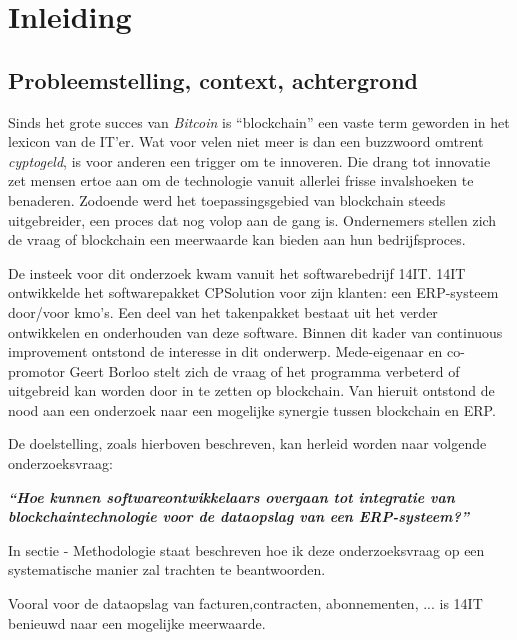 
\chapter{Inleiding}
\label{ch:inleiding}

\section{Probleemstelling, context, achtergrond}
\label{sec:probleemstelling}

Sinds het grote succes van \textit{Bitcoin} is ``blockchain'' een vaste term geworden in het lexicon van de IT'er. Wat voor velen niet meer is dan een buzzwoord omtrent \textit{cyptogeld}, is voor anderen een trigger om te innoveren.
Die drang tot innovatie zet mensen ertoe aan om de technologie vanuit allerlei frisse invalshoeken te benaderen. Zodoende werd het toepassingsgebied van blockchain steeds uitgebreider, een proces dat nog volop aan de gang is. Ondernemers stellen zich de vraag of blockchain een meerwaarde kan bieden aan hun bedrijfsproces.

De insteek voor dit onderzoek kwam vanuit het softwarebedrijf 14IT. 14IT ontwikkelde het softwarepakket CPSolution voor zijn klanten: een ERP-systeem door/voor kmo's. Een deel van het takenpakket bestaat uit het verder ontwikkelen en onderhouden van deze software. Binnen dit kader van continuous improvement ontstond de interesse in dit onderwerp. Mede-eigenaar en co-promotor Geert Borloo stelt zich de vraag of het programma verbeterd of uitgebreid kan worden door in te zetten op blockchain. Van hieruit ontstond de nood aan een onderzoek naar een mogelijke synergie tussen blockchain en ERP. 

De doelstelling, zoals hierboven beschreven, kan herleid worden naar volgende onderzoeksvraag:

\begin{center}
	\textit{\textbf{``Hoe kunnen softwareontwikkelaars overgaan tot integratie van blockchaintechnologie voor de dataopslag van een ERP-systeem?''}}
\end{center}

In sectie - Methodologie staat beschreven hoe ik deze onderzoeksvraag op een systematische manier zal trachten te beantwoorden.

Vooral voor de dataopslag van facturen,contracten, abonnementen, ...  is 14IT benieuwd naar een mogelijke meerwaarde.

